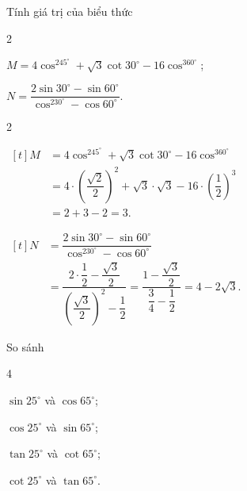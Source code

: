 \begin{bt}%
	Tính giá trị của biểu thức
	\begin{enumEX}{2}
	\item $M= 4\cos^245^{\circ} + \sqrt{3}\cot30^{\circ} - 16\cos^360^{\circ}$;
	\item $N =\dfrac{2\sin 30^{\circ} - \sin 60^{\circ}}{\cos^230^{\circ} - \cos 60^{\circ}}$.
	\end{enumEX}
	\loigiai
	{
	\begin{enumEX}{2}
	\item \allowdisplaybreaks $\begin{aligned}[t]
	M &= 4\cos^245^{\circ} + \sqrt{3}\cot30^{\circ} - 16\cos^360^{\circ}\\
	&= 4\cdot\left(\dfrac{\sqrt{2}}{2}\right)^2 + \sqrt{3}\cdot\sqrt{3} - 16\cdot\left(\dfrac{1}{2}\right)^3\\
	&= 2 + 3 - 2 = 3.
	\end{aligned}$
	\item \allowdisplaybreaks $\begin{aligned}[t]
	N &=\dfrac{2\sin 30^{\circ} - \sin 60^{\circ}}{\cos^230^{\circ} - \cos 60^{\circ}}\\
	&= \dfrac{2\cdot\dfrac{1}{2} - \dfrac{\sqrt{3}}{2}}{\left(\dfrac{\sqrt{3}}{2}\right)^2 - \dfrac{1}{2}}=\dfrac{1 - \dfrac{\sqrt{3}}{2}}{\dfrac{3}{4} - \dfrac{1}{2}}= 4 - 2\sqrt{3}.
	\end{aligned}$
	\end{enumEX}
	}
\end{bt}
\begin{bt}
	So sánh
	\begin{enumEX}{4}
	\item $\sin 25^\circ$ và $\cos 65^\circ$;
	\item $ \cos 25^\circ$ và $\sin 65^\circ$;
	\item $\tan 25^\circ$ và $\cot 65^\circ$;
	\item $\cot 25^\circ$ và $\tan 65^\circ$.
	\end{enumEX}
\end{bt}
